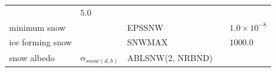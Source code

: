 \begin{longtable}[]{@{}lllll@{}}
\begin{minipage}[t]{0.04\columnwidth}
\strut
\end{minipage} & \begin{minipage}[t]{0.37\columnwidth}\raggedright
\(5.0\)\strut
\end{minipage}\tabularnewline
\begin{minipage}[t]{0.19\columnwidth}\raggedright
minimum snow\strut
\end{minipage} & \begin{minipage}[t]{0.15\columnwidth}\raggedright
\strut
\end{minipage} & \begin{minipage}[t]{0.11\columnwidth}\raggedright
EPSSNW\strut
\end{minipage} & \begin{minipage}[t]{0.04\columnwidth}\raggedright
\strut
\end{minipage} & \begin{minipage}[t]{0.37\columnwidth}\raggedright
\(1.0\times 10^{-8}\)\strut
\end{minipage}\tabularnewline
\begin{minipage}[t]{0.19\columnwidth}\raggedright
ice forming snow\strut
\end{minipage} & \begin{minipage}[t]{0.15\columnwidth}\raggedright
\strut
\end{minipage} & \begin{minipage}[t]{0.11\columnwidth}\raggedright
SNWMAX\strut
\end{minipage} & \begin{minipage}[t]{0.04\columnwidth}\raggedright
\strut
\end{minipage} & \begin{minipage}[t]{0.37\columnwidth}\raggedright
\(1000.0\)\strut
\end{minipage}\tabularnewline
\begin{minipage}[t]{0.19\columnwidth}\raggedright
snow albedo\strut
\end{minipage} & \begin{minipage}[t]{0.15\columnwidth}\raggedright
\(\alpha_{snow(d,b)}\)\strut
\end{minipage} & \begin{minipage}[t]{0.11\columnwidth}\raggedright
ABLSNW(2, NRBND)\strut
\end{minipage} & \begin{minipage}[t]{0.04\columnwidth}\raggedright
\strut
\end{minipage} & \begin{minipage}[t]{0.37\columnwidth}\raggedright

\end{minipage}
\end{longtable}
